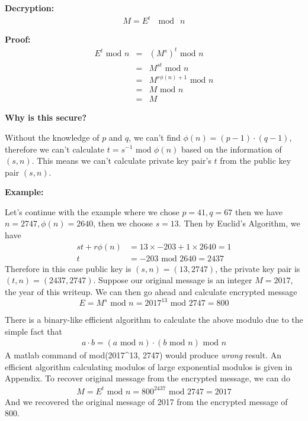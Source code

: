 \documentclass[]{paper}
\begin{document}
\textbf{Decryption:}
\begin{eqnarray*}
M = E^t\ \mod\ n 
\end{eqnarray*}

\textbf{Proof:}
\begin{eqnarray*}
E^t\text{ mod }n &=& (M^s)^t\text{ mod }n \\
&=& M^{s t}\text{ mod }n \\
&=& M^{r\phi(n) + 1}\text{ mod }n \\
&=& M\text{ mod }n \\
&=& M
\end{eqnarray*}

\textbf{Why is this secure?}
\bigskip

Without the knowledge of $p$ and $q$, we can't find $\phi(n)=(p-1)\cdot(q-1)$, therefore we can't calculate $t = s^{-1}\text{ mod }\phi(n)$ based on the information of $(s,n)$. This means we can't calculate private key pair's $t$ from the public key pair $(s,n)$.

\textbf{Example:}

Let's continue with the example where we chose $p = 41, q = 67$ then we have $n = 2747, \phi(n) = 2640$, then we choose $s = 13$. Then by Euclid's Algorithm, we have 
\begin{align*}
s t + r\phi(n) &= 13\times -203 + 1\times2640 = 1\\
t &= -203\text{ mod } 2640 = 2437
\end{align*}
Therefore in this case public key is $(s,n) = (13,2747)$, the private key pair is $(t,n) = (2437, 2747)$. Suppose our original message is an integer $M = 2017$, the year of this writeup. We can then go ahead and calculate encrypted message
\begin{equation*}
E = M^s\text{ mod }n = 2017^{13}\text{ mod }2747 = 800
\end{equation*}

There is a binary-like efficient algorithm to calculate the above modulo due to the simple fact that
\begin{align*}
    a\cdot b = (a\text{ mod }n)\cdot(b\text{ mod }n)\text{ mod }n
\end{align*}
A matlab command of mod(2017\^{}13, 2747) would produce \textit{wrong} result. An efficient algorithm calculating modulos of large exponential modulos is given in Appendix. To recover original message from the encrypted message, we can do
\begin{eqnarray*}
M = E^t\text{ mod }n = 800^{2437}\text{ mod }2747 = 2017
\end{eqnarray*}
And we recovered the original message of 2017 from the encrypted message of 800.
\newpage
\end{document}
